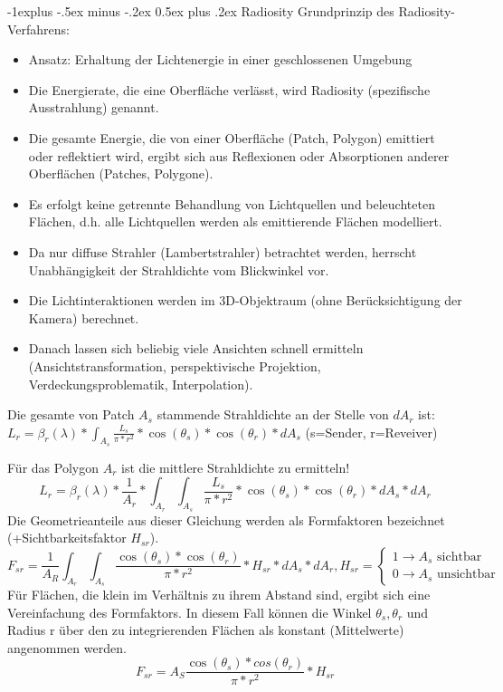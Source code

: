 \documentclass[10pt,landscape]{article}
\makeatletter
\renewcommand{\subsection}{\@startsection{subsection}{2}{0mm}%
                                {-1explus -.5ex minus -.2ex}%
                                {0.5ex plus .2ex}%
                                {\normalfont\normalsize\bfseries}}
\makeatother
\begin{document}
\begin{multicols}{3}
{  \subsection{ Radiosity}
  Grundprinzip des Radiosity-Verfahrens:
  \begin{itemize}
  \item Ansatz: Erhaltung der Lichtenergie in einer geschlossenen Umgebung
  \item Die Energierate, die eine Oberfläche verlässt, wird Radiosity (spezifische Ausstrahlung) genannt.
  \item Die gesamte Energie, die von einer Oberfläche (Patch, Polygon) emittiert oder reflektiert wird, ergibt sich aus Reflexionen oder Absorptionen anderer Oberflächen (Patches, Polygone).
  \item Es erfolgt keine getrennte Behandlung von Lichtquellen und beleuchteten Flächen, d.h. alle Lichtquellen werden als emittierende Flächen modelliert.
  \item Da nur diffuse Strahler (Lambertstrahler) betrachtet werden, herrscht Unabhängigkeit der Strahldichte vom Blickwinkel vor.
  \item Die Lichtinteraktionen werden im 3D-Objektraum (ohne Berücksichtigung der Kamera) berechnet.
  \item Danach lassen sich beliebig viele Ansichten schnell ermitteln (Ansichtstransformation, perspektivische Projektion, Verdeckungsproblematik, Interpolation).
  \end{itemize}
  
  Die gesamte von Patch $A_s$ stammende Strahldichte an der Stelle von $dA_r$ ist: $L_r=\beta_r(\lambda)*\int_{A_s}\frac{L_s}{\pi * r^2}*\cos(\theta_s)*\cos(\theta_r)*dA_s$ (s=Sender, r=Reveiver)
  
  Für das Polygon $A_r$ ist die mittlere Strahldichte zu ermitteln!
  $$L_r=\beta_r(\lambda)*\frac{1}{A_r}*\int_{A_r}\int_{A_s}\frac{L_s}{\pi*r^2}*\cos(\theta_s)*\cos(\theta_r)*dA_s*dA_r$$
  Die Geometrieanteile aus dieser Gleichung werden als Formfaktoren bezeichnet (+Sichtbarkeitsfaktor $H_{sr}$).
  $$F_{sr}=\frac{1}{A_R}\int_{A_r}\int_{A_s}\frac{\cos(\theta_s)*\cos(\theta_r)}{\pi*r^2}*H_{sr}*dA_s*dA_r, H_{sr}=\begin{cases}1\rightarrow A_s \text{ sichtbar}\\ 0\rightarrow A_s \text{ unsichtbar}\end{cases}$$
  Für Flächen, die klein im Verhältnis zu ihrem Abstand sind, ergibt sich eine Vereinfachung des Formfaktors. In diesem Fall können die Winkel $\theta_s,\theta_r$ und Radius r über den zu integrierenden Flächen als konstant (Mittelwerte) angenommen werden.
  $$F_{sr}=A_S \frac{\cos(\theta_s)*cos(\theta_r)}{\pi*r^2}*H_{sr}$$
  
}
\end{multicols}
\end{document}
